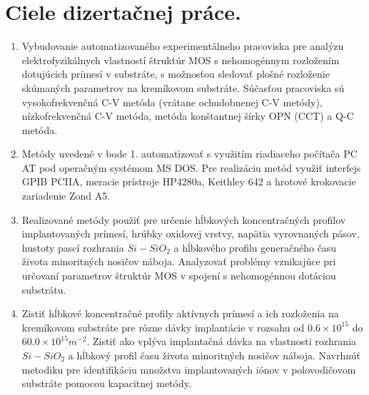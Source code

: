 \chapter{Ciele dizertačnej práce.}\label{Chapter2}

\begin{enumerate}
\item Vybudovanie automatizovaného experimentálneho pracoviska pre
  analýzu elektrofyzikálnych vlastností štruktúr MOS s nehomogénnym
  rozložením dotujúcich prímesí v substráte, s možnosťou sledovať
  plošné rozloženie skúmaných parametrov na kremíkovom substráte.
  Súčasťou pracoviska sú vysokofrekvenčná C-V metóda (vrátane
  ochudobnenej C-V metódy), nízkofrekvenčná C-V metóda, metóda
  konštantnej šírky OPN (CCT) a Q-C metóda.
\item Metódy uvedené v bode 1\@. automatizovať s využitím riadiaceho
  počítača PC AT pod operačným systémom MS DOS\@. Pre realizáciu metód
  využiť interfejs GPIB PCIIA, meracie prístroje HP4280a, Keithley 642
  a hrotové krokovacie zariadenie Zond A5.
\item Realizované metódy použiť pre určenie hĺbkových koncentračných
  profilov implantovaných prímesí, hrúbky oxidovej vrstvy, napätia
  vyrovnaných pásov, hustoty pascí rozhrania $Si-SiO_2$ a hĺbkového
  profilu generačného času života minoritných nosičov náboja.
  Analyzovať problémy vznikajúce pri určovaní parametrov štruktúr MOS
  v spojení s nehomogénnou dotáciou substrátu.
\item Zistiť hĺbkové koncentračné profily aktívnych prímesí a ich
  rozloženia na kremíkovom substráte pre rôzne dávky implantácie v
  rozsahu od $0.6\times{10}^{15}$ do
  $60.0\times{10}^{15}{m}^{-2}$. Zistiť ako vplýva implantačná dávka
  na vlastnosti rozhrania $Si-SiO_2$ a hĺbkový profil času života
  minoritných nosičov náboja.  Navrhnúť metodiku pre identifikáciu
  množstva implantovaných iónov v polovodičovom substráte pomocou
  kapacitnej metódy.
\end{enumerate}
